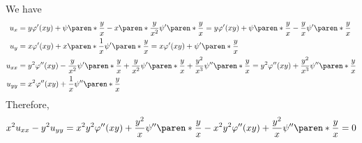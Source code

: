 \documentclass[11pt]{penrose}
\begin{document}
\begin{problem}{4}

    We have
    \begin{align*}
        u_{x} &= y \varphi'(xy) + \psi\paren*{\frac{y}{x}} - x \paren*{\frac{y}{x^2}} \psi'\paren*{\frac{y}{x}} = y \varphi'(xy) + \psi\paren*{\frac{y}{x}} - \frac{y}{x} \psi'\paren*{\frac{y}{x}}\\
        u_{y} &= x \varphi'(xy) + x \paren*{\frac{1}{x}} \psi'\paren*{\frac{y}{x}} = x \varphi'(xy) + \psi'\paren*{\frac{y}{x}}\\
        u_{xx} &= y^2 \varphi''(xy) - \frac{y}{x^2} \psi'\paren*{\frac{y}{x}} + \frac{y}{x^2} \psi'\paren*{\frac{y}{x}} + \frac{y^2}{x^3} \psi''\paren*{\frac{y}{x}}
        = y^2 \varphi''(xy) + \frac{y^2}{x^3} \psi''\paren*{\frac{y}{x}}\\
        u_{yy} &= x^2 \varphi''(xy) + \frac{1}{x} \psi''\paren*{\frac{y}{x}}
    \end{align*}
    Therefore,
    \begin{equation*}
        x^2 u_{xx} - y^2 u_{yy} = x^2 y^2 \varphi''(xy) + \frac{y^2}{x} \psi''\paren*{\frac{y}{x}} - x^2 y^2 \varphi''(xy) + \frac{y^2}{x} \psi''\paren*{\frac{y}{x}} = 0
    \end{equation*}
\end{problem}
\end{document}
